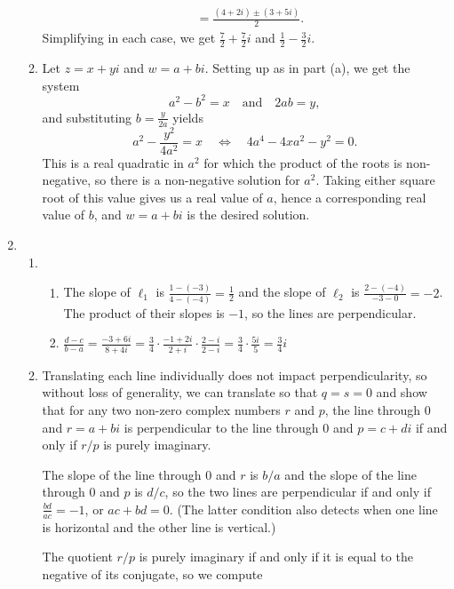 \begin{enumerate}
\begin{enumerate}
\begin{align*}
&= \frac{(4 + 2i)\pm (3 + 5i)}{2}.
\end{align*}
Simplifying in each case, we get $\frac{7}{2} + \frac{7}{2}i$ and $\frac{1}{2} - \frac{3}{2}i$.
\item Let $z = x + yi$ and $w = a + bi$. Setting up as in part (a), we get the system
\begin{equation*}
a^2 - b^2 = x\quad\text{and}\quad 2ab = y,
\end{equation*}
and substituting $b = \frac{y}{2a}$ yields
\begin{equation*}
a^2 - \frac{y^2}{4a^2} = x\quad\iff\quad 4a^4 - 4xa^2 - y^2 = 0.
\end{equation*}
This is a real quadratic in $a^2$ for which the product of the roots is non-negative, so there is a non-negative solution for $a^2$. Taking either square root of this value gives us a real value of $a$, hence a corresponding real value of $b$, and $w = a + bi$ is the desired solution.
\end{enumerate}
\item \begin{enumerate}
\item \begin{enumerate}
\item The slope of $\ell_1$ is $\frac{1 - (-3)}{4 - (-4)} = \frac{1}{2}$ and the slope of $\ell_2$ is $\frac{2 - (-4)}{-3 - 0} = -2$. The product of their slopes is $-1$, so the lines are perpendicular.
\item $\frac{d - c}{b - a} = \frac{-3 + 6i}{8 + 4i} = \frac{3}{4}\cdot\frac{-1 + 2i}{2 + i}\cdot\frac{2 - i}{2 - i} = \frac{3}{4}\cdot\frac{5i}{5} = \frac{3}{4}i$
\end{enumerate}
\item Translating each line individually does not impact perpendicularity, so without loss of generality, we can translate so that $q = s = 0$ and show that for any two non-zero complex numbers $r$ and $p$, the line through $0$ and $r = a + bi$ is perpendicular to the line through $0$ and $p = c + di$ if and only if $r/p$ is purely imaginary.\par
The slope of the line through $0$ and $r$ is $b/a$ and the slope of the line through $0$ and $p$ is $d/c$, so the two lines are perpendicular if and only if $\frac{bd}{ac} = -1$, or $ac + bd = 0$. (The latter condition also detects when one line is horizontal and the other line is vertical.)\par
The quotient $r/p$ is purely imaginary if and only if it is equal to the negative of its conjugate, so we compute

\end{enumerate}
\end{enumerate}

